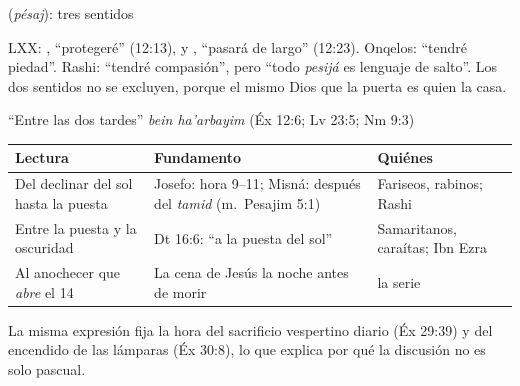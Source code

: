 \begin{frame}{ (\emph{pésaj}): tres sentidos}
\centering
{}\par\medskip
\scriptsize\RaggedRight LXX: , ``protegeré'' (12:13), y , ``pasará de largo'' (12:23). Onqelos: ``tendré piedad''. Rashi: ``tendré compasión'', pero ``todo \emph{pesijá} es lenguaje de salto''. Los dos sentidos no se excluyen, porque el mismo Dios que  la puerta es quien  la casa.
\end{frame}

\begin{frame}{``Entre las dos tardes''}
\centering{}\quad \emph{bein ha'arbayim} (Éx 12:6; Lv 23:5; Nm 9:3)\par\medskip
\scriptsize\renewcommand{\arraystretch}{1.2}
\begin{tabular}{@{}L{3.5cm}L{5.2cm}L{3.3cm}@{}}
\toprule
\textbf{Lectura} & \textbf{Fundamento} & \textbf{Quiénes} \\ \midrule
Del declinar del sol hasta la puesta & Josefo: hora 9--11; Misná: después del \emph{tamid} (m.~Pesajim 5:1) & Fariseos, rabinos; Rashi \\
Entre la puesta y la oscuridad & Dt 16:6: ``a la puesta del sol'' & Samaritanos, caraítas; Ibn Ezra \\
Al anochecer que \emph{abre} el 14 & La cena de Jesús la noche antes de morir & la serie \\
\bottomrule
\end{tabular}\par\medskip
\small\RaggedRight La misma expresión fija la hora del sacrificio vespertino diario (Éx 29:39) y del encendido de las lámparas (Éx 30:8), lo que explica por qué la discusión no es solo pascual.
\end{frame}

